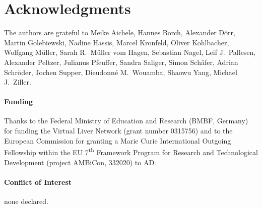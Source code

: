 \documentclass{bioinfo}
\begin{document}
\vspace{-.25cm}
\section*{Acknowledgments}

The authors are grateful to Meike Aichele, Hannes Borch, Alexander D\"orr, Martin Golebiewski, Nadine Hassis, Marcel Kronfeld, Oliver Kohlbacher, Wolfgang M\"uller, Sarah R.~M\"uller vom Hagen, Sebastian Nagel, Leif J.~Pallesen, Alexander Peltzer, Julianus Pfeuffer, Sandra Saliger, Simon Sch\"afer, Adrian Schr\"oder, Jochen Supper,
Dieudonn\'e M.~Wouamba, Shaowu Yang, Michael J.~Ziller.

\paragraph{Funding\textcolon}
Thanks to the Federal Ministry of Education and Research (BMBF, Germany) for funding the
Virtual Liver Network (grant number 0315756) and to the European Commission for granting 
a Marie Curie International Outgoing Fellowship
within the EU 7\textsuperscript{th} Framework Program for Research and Technological Development
(project AMBiCon, 332020) to AD.

\paragraph{Conflict of Interest\textcolon} none declared.

\vspace{-.25cm}
%
%
\end{document}
